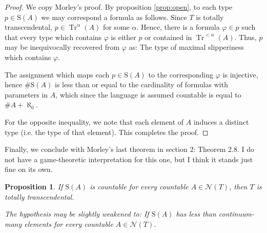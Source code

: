 \documentclass{article}
\newtheorem{prop}[theorem]{Proposition}
\theoremstyle{nonumberplain}
\newtheorem{proof}{Proof}
\newcommand{\calN}{\mathcal{N}}
\newcommand{\Stone}{\mathrm{S}}
\DeclareMathOperator{\Tr}{Tr}
\begin{document}
\begin{proof}
We copy Morley's proof. By proposition \ref{prop:open}, to each type $p \in \Stone(A)$ we may correspond a formula as follows. Since $T$ is totally transcendental, $p \in \Tr^\alpha(A)$ for some $\alpha$. Hence, there is a formula $\varphi \in p$ such that every type which contains $\varphi$ is either $p$ or contained in $\Tr^{<\alpha}(A)$. Thus, $p$ may be inequivocally recovered from $\varphi$ as: The type of maximal slipperiness which contains $\varphi$.

The assignment which maps each $p \in \Stone(A)$ to the corresponding $\varphi$ is injective, hence $\# \Stone(A)$ is less than or equal to the cardinality of formulas with parameters in $A$, which since the language is assumed countable is equal to $\# A + \aleph_0$.

For the opposite inequality, we note that each element of $A$ induces a distinct type (i.e. the type of that element). This completes the proof.
\end{proof}

Finally, we conclude with Morley's last theorem in section $2$: Theorem 2.8. I do not have a game-theoretic interpretation for this one, but I think it stands just fine on its own.

\begin{prop}
If $\Stone(A)$ is countable for every countable $A \in \calN(T)$, then $T$ is totally transcendental.

The hypothesis may be slightly weakened to: If $\Stone(A)$ has less than continuum-many elements for every countable $A \in \calN(T)$.
\end{prop}
\end{document}
